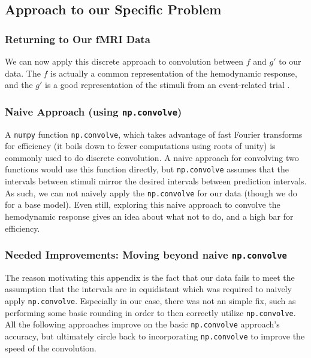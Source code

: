 \subsection{Approach to our Specific Problem}

\subsubsection{Returning to Our fMRI Data}

We can now apply this discrete approach to convolution between $f$ and $g'$ 
to our data. The $f$ is actually a common representation of the hemodynamic 
response, and the $g'$ is a good representation of the stimuli from an 
event-related trial \cite{brett2015course}. 

\subsubsection{Naive Approach (using \texttt{np.convolve})}

A \texttt{numpy} function \texttt{np.convolve}, which takes advantage of 
fast Fourier transforms for efficiency (it boils down to fewer computations 
using roots of unity) is commonly used to do discrete convolution. A naive 
approach for convolving two functions would use this function directly, but
\texttt{np.convolve} assumes that the intervals between stimuli mirror the 
desired intervals between prediction intervals. As such, we can not naively
apply the \texttt{np.convolve} for our data (though we do for a base model). 
Even still, exploring this naive approach to convolve the hemodynamic response 
gives an idea about what not to do, and a high bar for efficiency.

\subsubsection{Needed Improvements: Moving beyond naive \texttt{np.convolve}}

The reason motivating this appendix is the fact that our data fails to meet the 
assumption that the intervals are in equidistant which was required to naively 
apply \texttt{np.convolve}. Especially in our case, there 
was not an simple fix, such as performing some basic rounding in order to then 
correctly utilize \texttt{np.convolve}. All the following approaches improve on
the basic \texttt{np.convolve} approach's accuracy, but ultimately circle back 
to incorporating \texttt{np.convolve} to improve the speed of the convolution.

